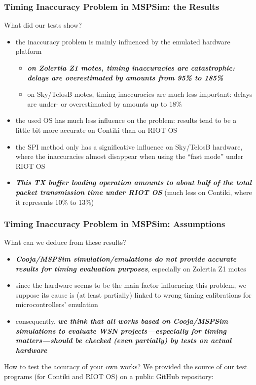 \documentclass[10pt,c]{beamer}
\renewcommand{\emph}[1]{\textbf{\textit{#1}}}
\begin{document}
\begin{frame}
\frametitle{Timing Inaccuracy Problem in MSPSim: the Results}
\begin{block}{What did our tests show?}
\begin{itemize}
\item the inaccuracy problem is mainly influenced by the emulated hardware
platform
  \begin{itemize}
  \item \emph{on Zolertia Z1 motes, timing inaccuracies are catastrophic:
  delays are overestimated by amounts from 95\% to 185\%}
  \item on Sky/TelosB motes, timing inaccuracies are much less important:
  delays are under- or overestimated by amounts up to 18\%
  \end{itemize}
\item the used OS has much less influence on the problem: results tend
to be a little bit more accurate on Contiki than on RIOT OS
\item the SPI method only has a significative influence on Sky/TelosB
hardware, where the inaccuracies almost disappear when using the ``fast
mode'' under RIOT OS
\item \emph{This TX buffer loading operation amounts to about half
of the total packet transmission time under RIOT OS} (much less on
Contiki, where it represents 10\% to 13\%)
\end{itemize}
\end{block}
\end{frame}

\begin{frame}
\frametitle{Timing Inaccuracy Problem in MSPSim: Assumptions}
\vspace{-0.25cm}
\begin{alertblock}{What can we deduce from these results?}
\begin{itemize}
\item \emph{Cooja/MSPSim simulation/emulations do not provide accurate
results for timing evaluation purposes}, especially on Zolertia Z1 motes
\item since the hardware seems to be the main factor influencing this
problem, we suppose its cause is (at least partially) linked to wrong
timing calibrations for microcontrollers' emulation
\item consequently, \emph{we think that all works based on Cooja/MSPSim
simulations to evaluate WSN projects---especially for timing
matters---should be checked (even partially) by tests on actual hardware}
\end{itemize}
\end{alertblock}
\vspace{-0.25cm}
\begin{exampleblock}{How to test the accuracy of your own works?}
\small
We provided the source of our test programs (for Contiki and RIOT OS)
on a public GitHub repository:
\vspace{-0.25cm}
\end{exampleblock}
\end{frame}
\end{document}
